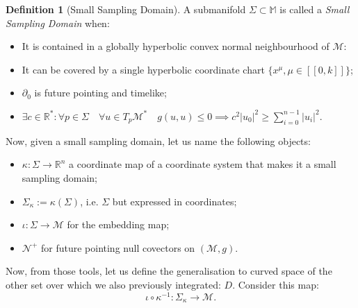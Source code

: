 \documentclass[a4paper,11pt]{article}
\numberwithin{equation}{section}
\theoremstyle{definition}
\newtheorem{definition}{Definition}
\newtheorem{comment}{Comment}
\begin{document}
\begin{definition}[Small Sampling Domain]
    A submanifold $\Sigma \subset \mathbb{M}$ is called a \emph{Small Sampling Domain} when:
    \begin{itemize}
        \item It is contained in a globally hyperbolic convex normal neighbourhood of $\mathcal{M}$:
        \item It can be covered by a single hyperbolic coordinate chart $\{x^\mu, \mu\in [\![0,k]\!]\}$;
        \item  $\partial_0$ is future pointing and timelike;
        \item $\exists c \in \mathbb{R}^* : \forall p \in \Sigma \quad \forall u \in T_p\mathcal{M}^* \quad g(u,u)\leq 0 \implies c^2|u_0|^2 \geq \sum_{i=0}^{n-1} |u_i|^2$.
    \end{itemize}
\end{definition}

\noindent Now, given a small sampling domain, let us name the following objects:
\begin{itemize}
	\item $\kappa : \Sigma \to \mathbb{R}^n$ a coordinate map of a coordinate system that makes it a small sampling domain;
	\item $\Sigma_\kappa:=\kappa(\Sigma)$,  i.e. $\Sigma$ but expressed in coordinates;
	\item $\iota : \Sigma \to \mathcal{M}$ for the embedding map; 
	\item $\mathcal{N}^+$ for future pointing null covectors on $(\mathcal{M},g)$.
\end{itemize}

Now, from those tools, let us define the generalisation to curved space of the other set over which we also previously integrated: $D$. Consider this map:
\begin{equation}
\iota \circ \kappa^{-1}: \Sigma_\kappa \to \mathcal{M}.
\end{equation}
\end{document}
